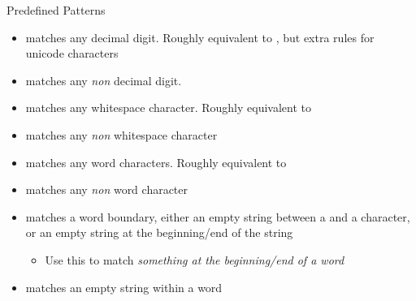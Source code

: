 \begin{frame}{Predefined Patterns}
%
\begin{itemize}
\item {} matches any decimal digit. Roughly equivalent to \rx{[0-9]}, but extra rules for unicode characters
\item {} matches any \emph{non} decimal digit.
\pause
\vspace{6pt}
\item {} matches any whitespace character. Roughly equivalent to 
\item {} matches any \emph{non} whitespace character
\pause
\vspace{6pt}
\item {} matches any word characters. Roughly equivalent to \rx{[a-zA-Z0-9\_]}
\item {} matches any \emph{non} word character
\pause
\vspace{6pt}
\item {} matches a word boundary, 
	\ie either an empty string between a  and a  character, 
	or an empty string at the beginning/end of the string
	\begin{itemize}
	\item Use this to match \emph{something at the beginning/end of a word}
	\end{itemize}
\item {} matches an empty string within a word
\end{itemize}
%
\end{frame}


